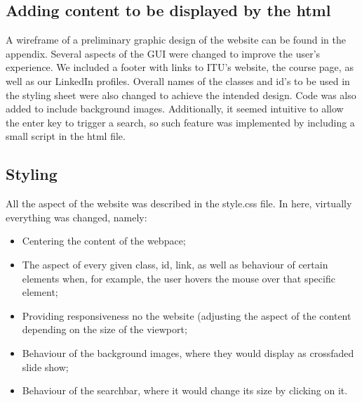 \subsection{Adding content to be displayed by the html}
A wireframe of a preliminary graphic design of the website can be found in the appendix. Several aspects of the GUI were changed to improve the user's experience. We included a footer with links to ITU's website, the course page, as well as our LinkedIn profiles. Overall names of the classes and id's to be used in the styling sheet were also changed to achieve the intended design. Code was also added to include background images.
Additionally, it seemed intuitive to allow the enter key to trigger a search, so such feature was implemented by including a small script in the html file.

\subsection{Styling}
All the aspect of the website was described in the style.css file. In here, virtually everything was changed, namely:
\begin{itemize}
    \item Centering the content of the webpace;
    \item The aspect of every given class, id, link, as well as behaviour of certain elements when, for example, the user hovers the mouse over that specific element;
    \item Providing responsiveness no the website (adjusting the aspect of the content depending on the size of the viewport;
    \item Behaviour of the background images, where they would display as crossfaded slide show;
    \item Behaviour of the searchbar, where it would change its size by clicking on it.
\end{itemize}

